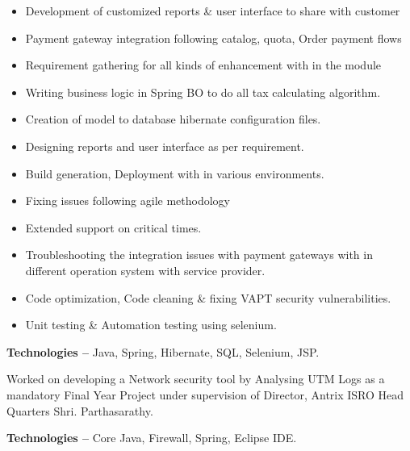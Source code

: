 \documentclass[10pt,a4paper,ragged2e]{altacv}
\begin{document}
\begin{itemize}
    \item Development of customized reports \& user interface to share with customer
    \item Payment gateway integration following catalog, quota, Order payment flows
    \item Requirement gathering for all kinds of enhancement with in the module
    \item Writing business logic in Spring BO to do all tax calculating algorithm.
    \item Creation of model to database hibernate configuration files. 
    \item Designing reports and user interface as per requirement. 
    \item Build generation, Deployment with in various environments. 
    \item Fixing issues following agile methodology 
    \item Extended support on critical times.
    \item Troubleshooting the integration issues with payment gateways with in different operation system with service provider.
    \item Code optimization, Code cleaning \& fixing VAPT security vulnerabilities. 
    \item Unit testing \& Automation testing using selenium.
\end{itemize}

\vspace{0.2cm}
\textbf{Technologies --} Java, Spring, Hibernate, SQL, Selenium, JSP.

\divider


Worked on developing a Network security tool by Analysing UTM Logs as a mandatory Final Year Project under supervision of Director, Antrix ISRO Head Quarters Shri. Parthasarathy.

\vspace{0.2cm}
\textbf{Technologies --} Core Java, Firewall, Spring, Eclipse IDE.


% 
% 
% 
% 
% 
% 
% 
 
\end{document}
